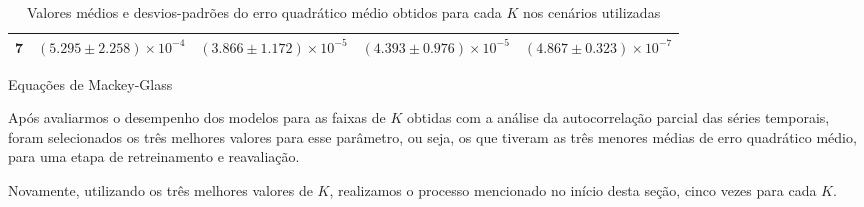 \documentclass[a4paper, 12pt]{article}
\begin{document}
\begin{table}[H]
\begin{center}
\begin{subtable}{1\textwidth}
\begin{center}
{\begin{tabular}{c c c c c}
 \hline
 \addlinespace
 $\bm{7}$ & $(5.295 \pm 2.258) \times 10^{-4}$ & $(3.866 \pm 1.172) \times 10^{-5}$ & $(4.393 \pm 0.976) \times 10^{-5}$ & $(4.867 \pm 0.323) \times 10^{-7}$\\
 \bottomrule
\end{tabular}}
\caption{Equações de Mackey-Glass}
\label{tab:mackeyglass-eqm}
\end{center}
\end{subtable}
\caption{Valores médios e desvios-padrões do erro quadrático médio obtidos para cada $K$ nos cenários utilizadas}
\label{tab:eqm-results}
\end{center}
\end{table}

Após avaliarmos o desempenho dos modelos para as faixas de $K$ obtidas com a análise da autocorrelação parcial das séries temporais, foram selecionados os três melhores valores para esse parâmetro, ou seja, os que tiveram as três menores médias de erro quadrático médio, para uma etapa de retreinamento e reavaliação. 

Novamente, utilizando os três melhores valores de $K$, realizamos o processo mencionado no início desta seção, cinco vezes para cada $K$. 
\end{document}
